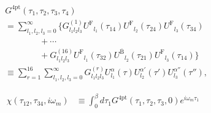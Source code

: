 \documentclass[prb,twocolumn,superscriptaddress]{revtex4-1}
\newcommand{\Gfour}{\ensuremath{G^\mathrm{4pt}}}
\newcommand{\UF}{\ensuremath{U^\mathrm{F}}}
\newcommand{\enhUB}{\ensuremath{U^\mathrm{\overline{B}}}}
\begin{document}
\begin{align}
	&\Gfour(\tau_1, \tau_2, \tau_3, \tau_4)
	\nonumber\\
	& = \sum_{l_1, l_2, l_3=0}^{\infty} \Big\{
	G_{l_1 l_2 l_3}^{(1)}  \UF_{l_1}(\tau_{14}) \UF_{l_2}(\tau_{24}) \UF_{l_3}(\tau_{34})
	\nonumber\\
	&\hspace{4em}+ \cdots \nonumber\\
	&\hspace{4em}+ G_{l_1 l_2 l_3}^{(16)} \UF_{l_1}(\tau_{32}) \enhUB_{l_2}(\tau_{21}) \UF_{l_3}(\tau_{14})
	\Big\}
	\nonumber\\
	& \equiv \sum_{r=1}^{16} \sum_{l_1, l_2, l_3=0}^{\infty} G_{l_1 l_2 l_3}^{(r)} U^{\alpha}_{l_1}(\tau) U^{\alpha'}_{l_2}(\tau') U^{\alpha''}_{l_3}(\tau''),
	\label{eq:ir-four-point}
\end{align}

\begin{align}
	\chi(\tau_{12}, \tau_{34}, i\omega_m) &\equiv \int_0^\beta d \tau_1 \Gfour(\tau_1, \tau_2, \tau_3, 0) e^{i\omega_m \tau_1}
\end{align}
\end{document}
